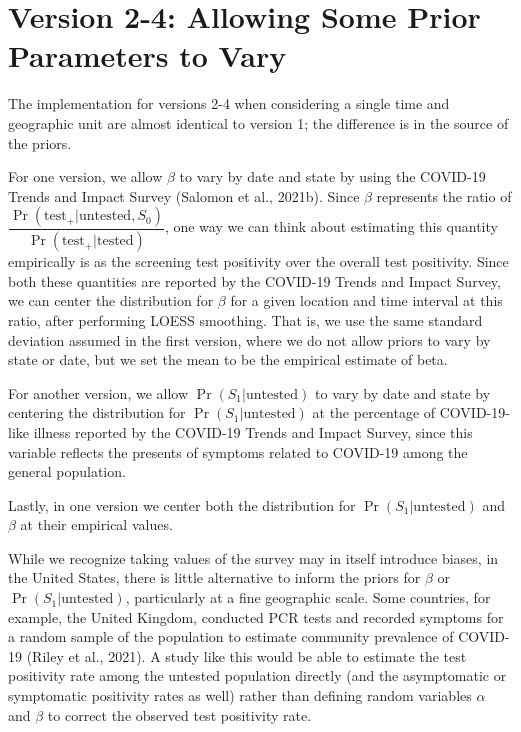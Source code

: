 \documentclass[12pt,twoside]{smiththesis}
\begin{document}
\hypertarget{version-2-4-allowing-some-prior-parameters-to-vary}{%
\section{Version 2-4: Allowing Some Prior Parameters to Vary}\label{version-2-4-allowing-some-prior-parameters-to-vary}}

The implementation for versions 2-4 when considering a single time and geographic unit are almost identical to version 1; the difference is in the source of the priors.

For one version, we allow \(\beta\) to vary by date and state by using the COVID-19 Trends and Impact Survey (Salomon et al., 2021b). Since \(\beta\) represents the ratio of \(\dfrac{\Pr(\text{test}_+|\text{untested},S_0)}{\Pr(\text{test}_+|\text{tested})}\), one way we can think about estimating this quantity empirically is as the screening test positivity over the overall test positivity. Since both these quantities are reported by the COVID-19 Trends and Impact Survey, we can center the distribution for \(\beta\) for a given location and time interval at this ratio, after performing LOESS smoothing. That is, we use the same standard deviation assumed in the first version, where we do not allow priors to vary by state or date, but we set the mean to be the empirical estimate of beta.

For another version, we allow \(\Pr(S_1|\text{untested})\) to vary by date and state by centering the distribution for \(\Pr(S_1|\text{untested})\) at the percentage of COVID-19-like illness reported by the COVID-19 Trends and Impact Survey, since this variable reflects the presents of symptoms related to COVID-19 among the general population.

Lastly, in one version we center both the distribution for \(\Pr(S_1|\text{untested})\) and \(\beta\) at their empirical values.

While we recognize taking values of the survey may in itself introduce biases, in the United States, there is little alternative to inform the priors for \(\beta\) or \(\Pr(S_1|\text{untested})\), particularly at a fine geographic scale. Some countries, for example, the United Kingdom, conducted PCR tests and recorded symptoms for a random sample of the population to estimate community prevalence of COVID-19 (Riley et al., 2021). A study like this would be able to estimate the test positivity rate among the untested population directly (and the asymptomatic or symptomatic positivity rates as well) rather than defining random variables \(\alpha\) and \(\beta\) to correct the observed test positivity rate.
\end{document}
